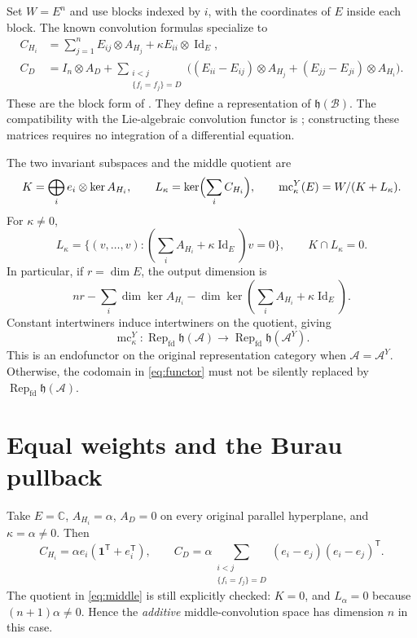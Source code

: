 \documentclass[11pt,a4paper]{article}
\theoremstyle{remark}\newtheorem{remark}[theorem]{Remark}
\newcommand{\C}{\mathbb C}
\newcommand{\A}{\mathcal A}
\newcommand{\B}{\mathcal B}
\newcommand{\h}{\mathfrak h}
\newcommand{\one}{\mathbf 1}
\newcommand{\mc}{\operatorname{mc}}
\newcommand{\Rep}{\operatorname{Rep}_{\mathrm{fd}}}
\newcommand{\Id}{\operatorname{Id}}
\begin{document}
Set $W=E^n$ and use blocks indexed by $i$, with the coordinates of $E$
inside each block.  The known convolution formulas specialize to
\begin{align}
C_{H_i}&=\sum_{j=1}^n E_{ij}\otimes A_{H_j}
          +\kappa E_{ii}\otimes\Id_E,\label{eq:transverse}\\
C_D&=I_n\otimes A_D+
\sum_{\substack{i<j\\\{f_i=f_j\}=D}}
\bigl((E_{ii}-E_{ij})\otimes A_{H_j}
 +(E_{jj}-E_{ji})\otimes A_{H_i}\bigr).
\label{eq:parallel}
\end{align}
These are the block form of \cite[Proposition~3.1]{AH}.  They define a representation
of $\h(\B)$.  The compatibility with the Lie-algebraic convolution functor
is \cite[Theorem 4.7]{Hiroe}; constructing these matrices requires no
integration of a differential equation.

The two invariant subspaces and the middle quotient are
\begin{equation}\label{eq:middle}
K=\bigoplus_i e_i\otimes\ker A_{H_i},\qquad
L_\kappa=\ker\Bigl(\sum_i C_{H_i}\Bigr),\qquad
\mc^Y_\kappa(E)=W/(K+L_\kappa).
\end{equation}
For $\kappa\ne0$,
\[
L_\kappa=\{(v,\ldots,v):(\sum_i A_{H_i}+\kappa\Id_E)v=0\},
\qquad K\cap L_\kappa=0.
\]
In particular, if $r=\dim E$, the output dimension is
\[
nr-\sum_i\dim\ker A_{H_i}
 -\dim\ker(\sum_i A_{H_i}+\kappa\Id_E).
\]
Constant intertwiners induce intertwiners on the quotient, giving
\begin{equation}\label{eq:functor}
\mc^Y_\kappa:\Rep\h(\A)\longrightarrow\Rep\h(\A^Y).
\end{equation}
This is an endofunctor on the original representation category when
$\A=\A^Y$.  Otherwise, the codomain in \eqref{eq:functor} must not be
silently replaced by $\Rep\h(\A)$.

\section{Equal weights and the Burau pullback}\label{sec:equal}
Take $E=\C$, $A_{H_i}=\alpha$, $A_D=0$ on every original parallel
hyperplane, and $\kappa=\alpha\ne0$.  Then
\begin{equation}\label{eq:equal}
C_{H_i}=\alpha e_i(\one^{\mathsf T}+e_i^{\mathsf T}),\qquad
C_D=\alpha\sum_{\substack{i<j\\\{f_i=f_j\}=D}}
 (e_i-e_j)(e_i-e_j)^{\mathsf T}.
\end{equation}
The quotient in \eqref{eq:middle} is still explicitly checked:
$K=0$, and $L_\alpha=0$ because $(n+1)\alpha\ne0$.  Hence the
\emph{additive} middle-convolution space has dimension $n$ in this case.
\end{document}
